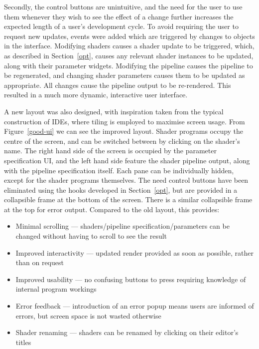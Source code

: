 \documentclass[12pt,twoside,notitlepage]{report}
\begin{document}
Secondly, the control buttons are unintuitive, and the need for the user to use them whenever they wish to see the effect of a change further increases the expected length of a user's development cycle. To avoid requiring the user to request new updates, events were added which are triggered by changes to objects in the interface. Modifying shaders causes a shader update to be triggered, which, as described in Section~\ref{opt}, causes any relevant shader instances to be updated, along with their parameter widgets. Modifying the pipeline causes the pipeline to be regenerated, and changing shader parameters causes them to be updated as appropriate. All changes cause the pipeline output to be re-rendered. This resulted in a much more dynamic, interactive user interface.

A new layout was also designed, with inspiration taken from the typical construction of IDEs, where tiling is employed to maximise screen usage. From Figure~\ref{good-ui} we can see the improved layout. Shader programs occupy the centre of the screen, and can be switched between by clicking on the shader's name. The right hand side of the screen is occupied by the parameter specification UI, and the left hand side feature the shader pipeline output, along with the pipeline specification itself. Each pane can be individually hidden, except for the shader programs themselves. The need control buttons have been eliminated using the hooks developed in Section~\ref{opt}, but are provided in a collapsible frame at the bottom of the screen. There is a similar collapsible frame at the top for error output. Compared to the old layout, this provides:
\begin{itemize}
\item Minimal scrolling --- shaders/pipeline specification/parameters can be changed without having to scroll to see the result
\item Improved interactivity --- updated render provided as soon as possible, rather than on request
\item Improved usability --- no confusing buttons to press requiring knowledge of internal program workings 
\item Error feedback --- introduction of an error popup means users are informed of errors, but screen space is not wasted otherwise
\item Shader renaming --- shaders can be renamed by clicking on their editor's titles
\end{itemize}
\end{document}
